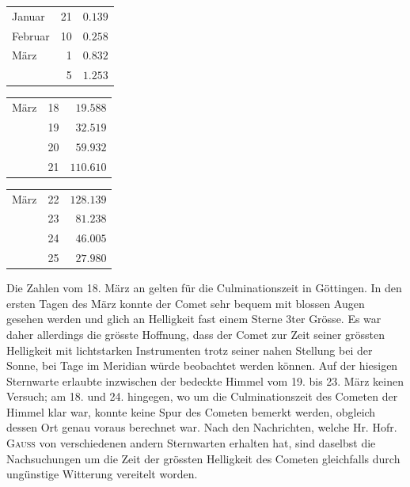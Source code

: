 \begin{center}
\begin{tabular}{lr|r}
Januar & 21 & $0.139$ \\
Februar & 10 & $0.258$ \\
März & 1 & $0.832$ \\
& 5 & $1.253$ \\
\end{tabular}
\end{center}
\begin{center}
\begin{tabular}{lr|r}
März & 18 & $19.588$ \\
& 19 & $32.519$ \\
& 20 & $59.932$ \\
& 21 & $110.610$ \\
\end{tabular}
\end{center}
\begin{center}
\begin{tabular}{lr|r}
März & 22 & $128.139$ \\
& 23 & $81.238$ \\
& 24 & $46.005$ \\
& 25 & $27.980$ \\
\end{tabular}
\end{center}

Die Zahlen vom 18. März an gelten für die Culminationszeit in Göttingen. In den ersten Tagen
des März konnte der Comet sehr bequem mit blossen Augen gesehen werden und glich an Helligkeit
fast einem Sterne 3ter Grösse. Es war daher allerdings die grösste Hoffnung, dass der Comet zur Zeit
seiner grössten Helligkeit mit lichtstarken Instrumenten trotz seiner nahen Stellung bei der Sonne, bei
Tage im Meridian würde beobachtet werden können. Auf der hiesigen Sternwarte erlaubte inzwischen
der bedeckte Himmel vom 19. bis 23. März keinen Versuch; am 18. und 24. hingegen, wo um die 
%
Culminationszeit des Cometen der Himmel klar war, konnte keine Spur des Cometen bemerkt werden, obgleich dessen Ort genau voraus berechnet war. Nach den Nachrichten, welche Hr. Hofr. \textsc{Gauss} von
verschiedenen andern Sternwarten erhalten hat, sind daselbst die Nachsuchungen um die Zeit der grössten Helligkeit des Cometen gleichfalls durch ungünstige Witterung vereitelt worden.

